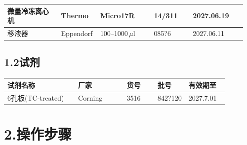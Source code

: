 \documentclass[UTF8,10pt,a4paper,fontset=fandol]{ctexart}
\newcommand{\fieldvalue}[1]{#1}
\newcommand{\handwritten}[1]{#1}
\begin{document}
\begin{tabular}{|p{0.22\linewidth}|p{0.14\linewidth}|p{0.22\linewidth}|p{0.16\linewidth}|p{0.22\linewidth}|}
\fieldvalue{微量冷冻离心机} &
\fieldvalue{Thermo} &
\fieldvalue{Micro17R} &
\fieldvalue{\handwritten{14/311}} &
\fieldvalue{\handwritten{2027.06.19}}
\\ \hline
\fieldvalue{移液器} &
\fieldvalue{Eppendorf} &
\fieldvalue{\handwritten{100--1000\,$\mu$l}} &
\fieldvalue{\handwritten{085?6}} &
\fieldvalue{\handwritten{2027.06.11}}
\\ \hline
\end{tabular}

\subsection{1.2\quad 试剂}

\begin{tabular}{|p{0.32\linewidth}|p{0.22\linewidth}|p{0.14\linewidth}|p{0.14\linewidth}|p{0.18\linewidth}|}
\hline
\textbf{试剂名称} & \textbf{厂家} & \textbf{货号} & \textbf{批号} & \textbf{有效期至} \\ \hline
\fieldvalue{6孔板(TC-treated)} &
\fieldvalue{Corning} &
\fieldvalue{3516} &
\fieldvalue{\handwritten{842?120}} &
\fieldvalue{\handwritten{2027.7.01}}
\\ \hline
\end{tabular}

\section{2.\quad 操作步骤}
\end{document}
